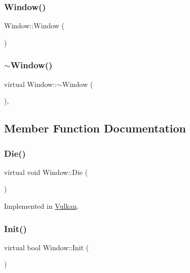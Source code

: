 \subsubsection{\texorpdfstring{Window()}{Window()}}
{\footnotesize\ttfamily Window\+::\+Window (\begin{DoxyParamCaption}{ }\end{DoxyParamCaption})\hspace{0.3cm}{\ttfamily [inline]}}

\mbox{\label{classWindow_a62b4a97b3c2e492f1d9a46092011e2d9}} 
\subsubsection{\texorpdfstring{$\sim$\+Window()}{~Window()}}
{\footnotesize\ttfamily virtual Window\+::$\sim$\+Window (\begin{DoxyParamCaption}{ }\end{DoxyParamCaption})\hspace{0.3cm}{\ttfamily [inline]}, {\ttfamily [virtual]}}



\subsection{Member Function Documentation}
\mbox{\label{classWindow_a5332552d06a88b58486c0ab803356d01}} 
\subsubsection{\texorpdfstring{Die()}{Die()}}
{\footnotesize\ttfamily virtual void Window\+::\+Die (\begin{DoxyParamCaption}{ }\end{DoxyParamCaption})\hspace{0.3cm}{\ttfamily [pure virtual]}}



Implemented in \mbox{\hyperlink{classVulkan_a728e47da1e42d65c6d9efa5106f6d13b}{Vulkan}}.

\mbox{\label{classWindow_a91ad1340d4f60465f0e6eef38f0e5fb1}} 
\subsubsection{\texorpdfstring{Init()}{Init()}}
{\footnotesize\ttfamily virtual bool Window\+::\+Init (\begin{DoxyParamCaption}{ }\end{DoxyParamCaption})\hspace{0.3cm}{\ttfamily [pure virtual]}}




